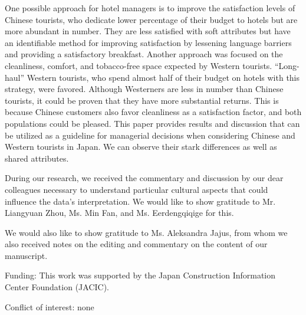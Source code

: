 \documentclass[smallextended,natbib]{svjour3}       %
\begin{document}
  One possible approach for hotel managers is to improve the satisfaction levels of Chinese tourists, who dedicate lower percentage of their budget to hotels but are more abundant in number. They are less satisfied with soft attributes but have an identifiable method for improving satisfaction by lessening language barriers and providing a satisfactory breakfast. Another approach was focused on the cleanliness, comfort, and tobacco-free space expected by Western tourists. ``Long-haul'' Western tourists, who spend almost half of their budget on hotels with this strategy, were favored. Although Westerners are less in number than Chinese tourists, it could be proven that they have more substantial returns. This is because Chinese customers also favor cleanliness as a satisfaction factor, and both populations could be pleased. This paper provides results and discussion that can be utilized as a guideline for managerial decisions when considering Chinese and Western tourists in Japan. We can observe their stark differences as well as shared attributes. 

\begin{acknowledgements}

  During our research, we received the commentary and discussion by our dear colleagues necessary to understand particular cultural aspects that could influence the data's interpretation. We would like to show gratitude to Mr. Liangyuan Zhou, Ms. Min Fan, and Ms. Eerdengqiqige for this.

  We would also like to show gratitude to Ms. Aleksandra Jajus, from whom we also received notes on the editing and commentary on the content of our manuscript.

  \medskip

  Funding: This work was supported by the Japan Construction Information Center Foundation (JACIC).

  \medskip

  Conflict of interest: none

\end{acknowledgements}



\end{document}

